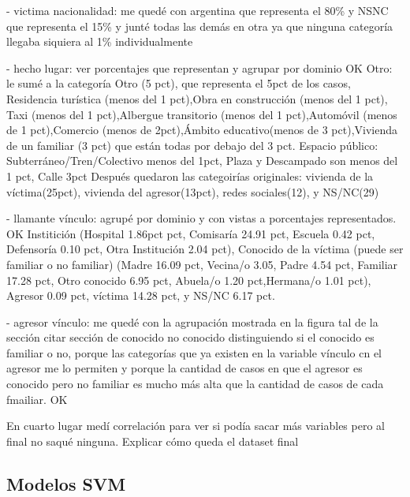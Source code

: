 \documentclass[10 pt]{article}
\begin{document}
- victima nacionalidad: me quedé con argentina que representa el 80\% y NSNC que representa el 15\% y junté todas las demás en otra ya que ninguna categoría llegaba siquiera al 1\% individualmente

- hecho lugar: ver porcentajes que representan y agrupar por dominio OK
Otro: le sumé a la categoría Otro (5 pct), que representa el 5pct de los casos,  Residencia turística (menos del 1 pct),Obra en construcción (menos del 1 pct), Taxi (menos del 1 pct),Albergue transitorio (menos del 1 pct),Automóvil (menos de 1 pct),Comercio (menos de 2pct),Ámbito educativo(menos de 3 pct),Vivienda de un familiar (3 pct) que están todas por debajo del 3 pct.
Espacio público: Subterráneo/Tren/Colectivo menos del 1pct, Plaza y Descampado son menos del 1 pct, Calle 3pct
Después quedaron las categoirías originales: vivienda de la víctima(25pct), vivienda del agresor(13pct), redes sociales(12), y NS/NC(29)


- llamante vínculo: agrupé por dominio y con vistas a porcentajes representados. OK
 Institición (Hospital 1.86pct pct, Comisaría 24.91 pct, Escuela 0.42 pct, Defensoría 0.10 pct, Otra Institución 2.04 pct), Conocido de la víctima (puede ser familiar o no familiar) (Madre 16.09 pct, Vecina/o 3.05, Padre 4.54 pct, Familiar 17.28 pct, Otro conocido 6.95 pct, Abuela/o 1.20 pct,Hermana/o 1.01 pct), Agresor 0.09 pct, víctima 14.28 pct, y NS/NC 6.17 pct.

- agresor vínculo: me quedé con la agrupación mostrada en la figura tal de la sección citar sección  de conocido no conocido  distinguiendo si el conocido es familiar o no, porque las categorías que ya existen en la variable vínculo cn el agresor me lo permiten y porque la cantidad de casos en que el agresor es conocido pero no familiar es mucho más alta que la cantidad de casos de cada fmailiar. OK



En cuarto lugar  medí correlación para ver si podía sacar más variables pero al final no saqué ninguna. Explicar cómo queda el dataset final 



\subsection{Modelos SVM}\label{svm}

\end{document}
